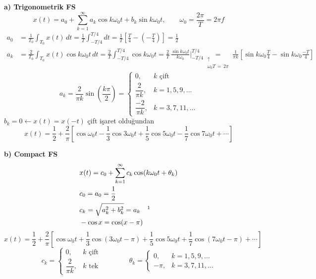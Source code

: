 \documentclass[11pt,a4paper]{article}
\begin{document}
\begin{cozum}
\textbf{a) Trigonometrik FS}
\[ x(t) = a_0 + \sum_{k=1}^{\infty} a_k\cos k\omega_0 t + b_k\sin k\omega_0 t, \qquad \omega_0 = \frac{2\pi}{T} = 2\pi f \]
\begin{align*}
  a_0 &= \frac{1}{T_0}\int_{T_0} x(t)\,dt = \frac{1}{T}\int_{-T/4}^{T/4} dt = \frac{1}{T}\left[\frac{T}{4} - \left(-\frac{T}{4}\right)\right] = \frac{1}{2} \\
  a_k &= \frac{2}{T_0}\int_{T_0} x(t)\cos k\omega_0 t\,dt = \frac{2}{T}\int_{-T/4}^{T/4} \cos k\omega_0 t = \frac{2}{T}\,\frac{\sin k\omega_0 t}{k\omega_0}\Bigg|_{-T/4}^{T/4} \underset{\substack{\uparrow\\ \omega_0 T\,=\,2\pi}}{=} \frac{1}{\pi k}\left[\sin k\omega_0\frac{T}{4} - \sin k\omega_0\frac{-T}{4}\right]
\end{align*}
\[ a_k = \frac{2}{\pi k}\sin\left(\frac{k\pi}{2}\right) = \begin{cases} 0, & k \text{ çift} \\[1mm] \dfrac{2}{\pi k}, & k = 1, 5, 9, \ldots \\[3mm] \dfrac{-2}{\pi k}, & k = 3, 7, 11, \ldots \end{cases} \]
$b_k = 0 \longleftarrow x(t) = x(-t)$ çift işaret olduğundan
\[ x(t) = \frac{1}{2} + \frac{2}{\pi}\left[\cos\omega_0 t - \frac{1}{3}\cos 3\omega_0 t + \frac{1}{5}\cos 5\omega_0 t - \frac{1}{7}\cos 7\omega_0 t + \cdots\right] \]

\textbf{b) Compact FS}
\begin{align*}
  & x(t) = c_0 + \sum_{k=1}^{\infty} c_k\cos(k\omega_0 t + \theta_k) \\
  & c_0 = a_0 = \frac{1}{2} \\
  & c_k = \sqrt{a_k^2 + b_k^2} = a_k \quad \text{\footnotemark} \\
  & -\cos x = \cos(x - \pi)
\end{align*}
\[ x(t) = \frac{1}{2} + \frac{2}{\pi}\left[\cos\omega_0 t + \frac{1}{3}\cos(3\omega_0 t - \pi) + \frac{1}{5}\cos 5\omega_0 t + \frac{1}{7}\cos(7\omega_0 t - \pi) + \cdots\right] \]
\[ c_k = \begin{cases} 0, & k \text{ çift} \\[1mm] \dfrac{2}{\pi k}, & k \text{ tek} \end{cases} \qquad\qquad \theta_k = \begin{cases} 0, & k = 1, 5, 9, \ldots \\ -\pi, & k = 3, 7, 11, \ldots \end{cases} \]
\end{cozum}
\end{document}
